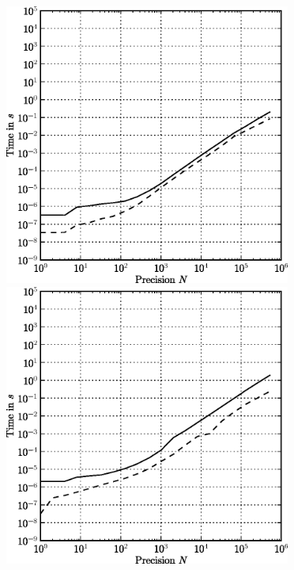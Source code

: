 \begin{figure}[ht]
\begin{minipage}[t]{0.5\linewidth}
\centering
\includegraphics[width=0.84\textwidth]{bin/qp-mul}
\end{minipage}
\begin{minipage}[t]{0.5\linewidth}
\centering
\includegraphics[width=0.84\textwidth]{bin/qp-inv}
\end{minipage}\\


\end{figure}
